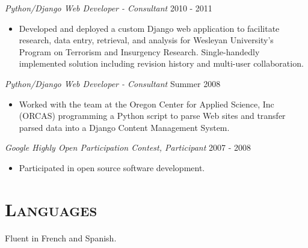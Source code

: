 \documentclass[margin]{res}
\begin{document}
\begin{resume}
    {\sl Python/Django Web Developer - Consultant} \hfill 2010 - 2011
    \begin{itemize}  \itemsep -2pt %
        \item Developed and deployed a custom Django web application to facilitate research, data entry, retrieval, and analysis for Wesleyan University's Program on Terrorism and Insurgency Research. Single-handedly implemented solution including revision history and multi-user collaboration.
    \end{itemize}

    {\sl Python/Django Web Developer - Consultant} \hfill  Summer 2008
    \begin{itemize}  \itemsep -2pt %
        \item Worked with the team at the Oregon Center for Applied Science, Inc (ORCAS) programming a Python script to parse Web sites and transfer parsed data into a Django Content Management System.
    \end{itemize}

    {\sl Google Highly Open Participation Contest, Participant} \hfill 2007 - 2008
    \begin{itemize}  \itemsep -2pt %
        \item Participated in open source software development.
    \end{itemize}

\section{\textsc{Languages}} Fluent in French  and Spanish.

\end{resume}
\end{document}
